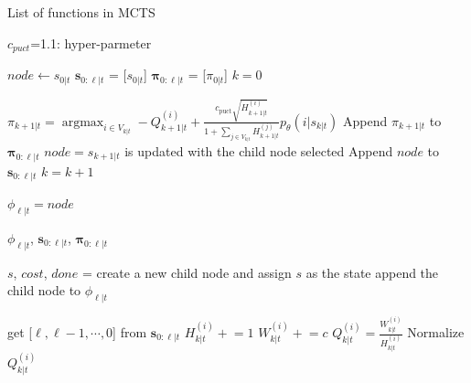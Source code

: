 \documentclass{article}
\DeclareMathOperator*{\argmax}{argmax}
\begin{document}
\begin{algorithm}
\caption{List of functions in MCTS}\label{alg:MCTS functions}

\begin{algorithmic}[1]
\Require $c_{puct}$=1.1: hyper-parmeter
\item[]

    \State $node \gets s_{0|t}$
    \State $\boldsymbol{s}_{0:\ell|t}$ = [$s_{0|t}$]
    \State $\boldsymbol{\pi}_{0:\ell|t}$ = [$\pi_{0|t}$]
    \State $k=0$

        \State $\pi_{k+1|t} = \argmax_{i \in V_{k|t}} -Q^{(i)}_{k+1|t} +  \frac{c_{\mbox{puct}} \sqrt{H^{(i)}_{k+1|t}}}{1 + \sum_{j\in V_{k|t}}H^{(j)}_{k+1|t}} p_{\theta}(i| s_{k|t})$   
        \State Append $\pi_{k+1|t}$ to $\boldsymbol{\pi}_{0:\ell|t}$
        \State $node=s_{k+1|t}$ is updated with the child node selected
        \State Append $node$ to $\boldsymbol{s}_{0:\ell|t}$
        \State $k = k + 1$

    \EndWhile
    \State $\phi_{\ell|t} = node$ 

\State \Return $\phi_{\ell|t}$,  $\boldsymbol{s}_{0:\ell|t}$,  $\boldsymbol{\pi}_{0:\ell|t}$
\EndFunction

\item[]


    \State $s$, $cost$, $done$ =   
    \State create a new child node and assign $s$ as the state
    \State append the child node to $\phi_{\ell|t}$

\EndFor
\EndFunction
\item[]


\item[]

    \State get [$\ell, \ell-1, \cdots, 0$] from $\boldsymbol{s}_{0:\ell|t}$
     
        \State $H_{k|t}^{(i)} \mathrel{+}= 1$
        \State $W_{k|t}^{(i)} \mathrel{+}= c$
        \State $Q_{k|t}^{(i)} = \frac{W_{k|t}^{(i)} }{H_{k|t}^{(i)}}$
        \State Normalize $Q_{k|t}^{(i)}$
    \EndFor
\EndFunction

\end{algorithmic}
\end{algorithm}
\end{document}
